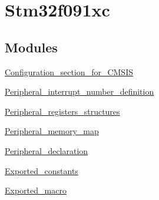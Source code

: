 \hypertarget{group__stm32f091xc}{}\section{Stm32f091xc}
\label{group__stm32f091xc}
\subsection*{Modules}
\begin{DoxyCompactItemize}
\item 
\hyperlink{group___configuration__section__for___c_m_s_i_s}{Configuration\+\_\+section\+\_\+for\+\_\+\+C\+M\+S\+IS}
\item 
\hyperlink{group___peripheral__interrupt__number__definition}{Peripheral\+\_\+interrupt\+\_\+number\+\_\+definition}
\item 
\hyperlink{group___peripheral__registers__structures}{Peripheral\+\_\+registers\+\_\+structures}
\item 
\hyperlink{group___peripheral__memory__map}{Peripheral\+\_\+memory\+\_\+map}
\item 
\hyperlink{group___peripheral__declaration}{Peripheral\+\_\+declaration}
\item 
\hyperlink{group___exported__constants}{Exported\+\_\+constants}
\item 
\hyperlink{group___exported__macro}{Exported\+\_\+macro}
\end{DoxyCompactItemize}
